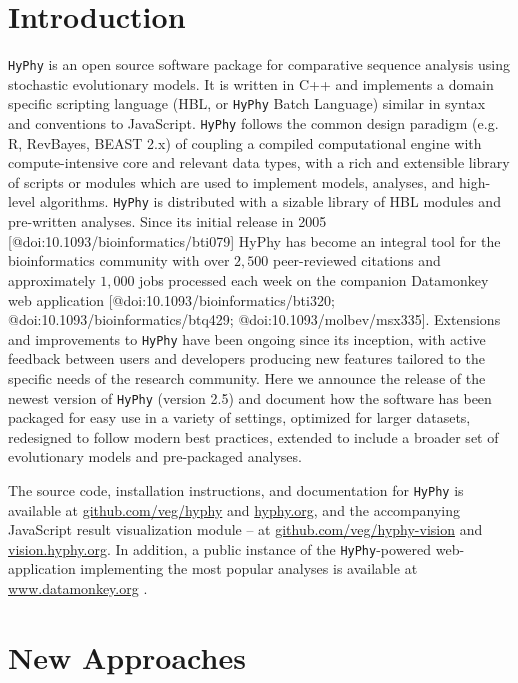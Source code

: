 \documentclass[nogrid]{MBE}%
\newcommand{\hyphy}{{\tt HyPhy}}
\begin{document}
\section{{Introduction}\label{sec:Intro}}

\hyphy{} is an open source software package for comparative sequence analysis
using stochastic evolutionary models. It is written in C++ and implements a
domain specific scripting language (HBL, or \hyphy{} Batch Language) similar in
syntax and conventions to JavaScript. \hyphy{} follows the common design
paradigm (e.g. R\cite{team2013r}, RevBayes\cite{hohna2016revbayes}, BEAST
2.x\cite{bouckaert2014beast}) of coupling a compiled computational engine with
compute-intensive core and relevant data types, with a rich and extensible
library of scripts or modules which are used to implement models, analyses, and
high-level algorithms. \hyphy{} is distributed with a sizable library of HBL
modules and pre-written analyses.  Since its initial release in 2005
[@doi:10.1093/bioinformatics/bti079] HyPhy has become an integral tool for the
bioinformatics community with over $2,500$ peer-reviewed citations and
approximately $1,000$ jobs processed each week on the companion Datamonkey web
application [@doi:10.1093/bioinformatics/bti320;
@doi:10.1093/bioinformatics/btq429; @doi:10.1093/molbev/msx335]. Extensions and
improvements to \hyphy{} have been ongoing since its inception, with active
feedback between users and developers producing new features tailored to the
specific needs of the research community. Here we announce the release of the
newest version of \hyphy{} (version 2.5) and document how the software has been
packaged for easy use in a variety of settings, optimized for larger datasets,
redesigned to follow modern  best practices, extended to include a broader set
of evolutionary models and pre-packaged analyses. 

The source code, installation instructions, and documentation for \hyphy{} is
available at \url{github.com/veg/hyphy} and \url{hyphy.org}, and the
accompanying JavaScript result visualization module -- at
\url{github.com/veg/hyphy-vision} and \url{vision.hyphy.org}. In addition, a public instance of the
\hyphy-powered web-application implementing the most popular analyses is
available at \url{www.datamonkey.org} \cite{weaver2018datamonkey}. 


\section{{New Approaches}\label{sec:Approaches}}
\end{document}
